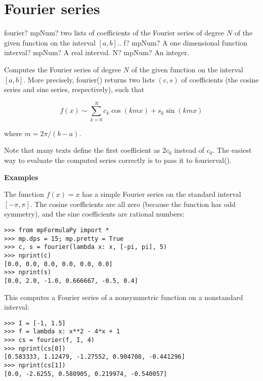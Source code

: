 \newpage
\section{Fourier series}


\begin{mpFunctionsExtract}
	\mpFunctionThree
	{fourier? mpNum? two lists of coefficients of the Fourier series of degree $N$ of the given function on the interval $[a,b]$..}
	{f? mpNum? A one dimensional function}
	{interval? mpNum? A real interval.}	
	{N? mpNum? An integer.}		
\end{mpFunctionsExtract}

\vpara
Computes the Fourier series of degree $N$ of the given function on the interval $[a,b]$. More precisely, fourier() returns two lists $(c,s)$ of coefficients (the cosine series and sine series, respectively), such that

\begin{equation}
f(x) \sim \sum_{k=0}^N c_k \cos(kmx) + s_k \sin(kmx)
\end{equation}

where $m=2\pi/(b-a)$.

Note that many texts define the first coefficient as $2c_0$ instead of $c_0$. The easiest way to evaluate the computed series correctly is to pass it to fourierval().

\vpara
\textbf{Examples}

The function $f(x)=x$ has a simple Fourier series on the standard interval $[-\pi,\pi]$. The cosine coefficients are all zero (because the function has odd symmetry), and the sine coefficients are rational numbers:

\begin{lstlisting}
>>> from mpFormulaPy import *
>>> mp.dps = 15; mp.pretty = True
>>> c, s = fourier(lambda x: x, [-pi, pi], 5)
>>> nprint(c)
[0.0, 0.0, 0.0, 0.0, 0.0, 0.0]
>>> nprint(s)
[0.0, 2.0, -1.0, 0.666667, -0.5, 0.4]
\end{lstlisting}

This computes a Fourier series of a nonsymmetric function on a nonstandard interval:

\begin{lstlisting}
>>> I = [-1, 1.5]
>>> f = lambda x: x**2 - 4*x + 1
>>> cs = fourier(f, I, 4)
>>> nprint(cs[0])
[0.583333, 1.12479, -1.27552, 0.904708, -0.441296]
>>> nprint(cs[1])
[0.0, -2.6255, 0.580905, 0.219974, -0.540057]
\end{lstlisting}

